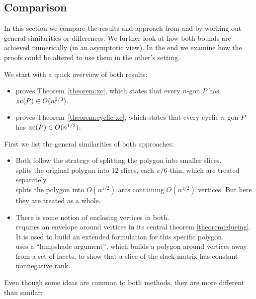 \subsection{Comparison}

In this section we compare the results and approach from \cite{shitov2020sublinear} and \cite{kwan2020extension} by working out general similarities or differences. We further look at how both bounds are achieved numerically (in an asymptotic view). In the end we examine how the proofs could be altered to use them in the other's setting.

We start with a quick overview of both results:

\begin{itemize}
  \item \cite{shitov2020sublinear} proves Theorem~\ref{theorem:xc}, which states that every $n$-gon $P$ has $\operatorname{xc}(P) \in O(n^{2/3})$.
  \item \cite{kwan2020extension} proves Theorem~\ref{theorem:cyclic-xc}, which states that every cyclic $n$-gon $P$ has $\operatorname{xc}(P) \in O(n^{1/2})$.
\end{itemize}

First we list the general similarities of both approaches:

\begin{itemize}
  \item Both follow the strategy of splitting the polygon into smaller slices.\\
  \cite{shitov2020sublinear} splits the original polygon into $12$ slices, each $\pi/6$-thin, which are treated separately.\\
  \cite{kwan2020extension} splits the polygon into $O(n^{1/2})$ arcs containing $O(n^{1/2})$ vertices. But here they are treated as a whole.

  \item There is some notion of enclosing vertices in both.\\
  \cite{shitov2020sublinear} requires an envelope around vertices in its central theorem \ref{theorem:glueing}. It is used to build an extended formulation for this specific polygon.\\
  \cite{kwan2020extension} uses a ``lampshade argument'', which builds a polygon around vertices away from a set of facets, to show that a slice of the slack matrix has constant nonnegative rank.
\end{itemize}

Even though some ideas are common to both methods, they are more different than similar:

